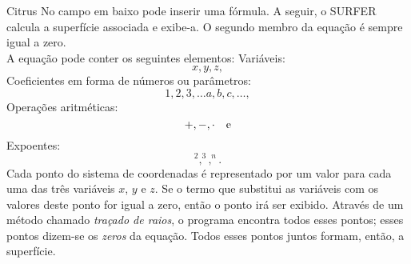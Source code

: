 \begin{surferPage}{Citrus}
No campo em baixo  pode inserir uma f\'ormula. A seguir, o SURFER calcula a superf\'icie associada e exibe-a. O segundo membro da equa\c c\~ao  \'e sempre igual a zero.
\\
A equa\c c\~ao pode conter os seguintes elementos:
\newline
Vari\'aveis:
\[x, y, z, \]
Coeficientes em forma de n\'umeros ou par\^ametros:
\[1, 2, 3, \dots a, b, c, \dots, \]
Opera\c c\~oes aritm\'eticas:
\[+,  - , \cdot \quad \textnormal{e} \]
Expoentes:
\[ ^2, ^3, ^n .\]
Cada ponto do sistema de coordenadas \'e representado por um valor para cada uma das tr\^es vari\'aveis $x$, $y$ e $z$. Se o termo que substitui as vari\'aveis com os valores deste ponto for igual a zero, ent\~ao o ponto ir\'a ser exibido. Atrav\'es de um m\'etodo chamado \textit{tra\c cado de raios}, o programa encontra todos esses pontos; esses pontos dizem-se os {\it  zeros} da equa\c c\~ao. Todos esses pontos juntos formam, ent\~ao, a superf\'icie.
\end{surferPage}

